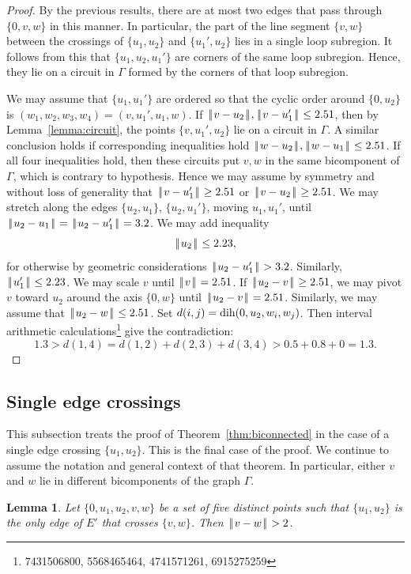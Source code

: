 \documentclass[11pt]{amsart}
\def\op#1{{\text{#1}}}
\def\text{\hbox}
\def\|{{\hskip0.1em|\hskip-0.15em|\hskip0.1em}}
\newtheorem{lemma}{Lemma}
\begin{document}
\begin{proof}  By the previous results, there are at most two edges that pass through $\{0,v,w\}$
in this manner.  In particular, the part of the line segment $\{v,w\}$ between the crossings
of $\{u_1,u_2\}$ and $\{u_1',u_2\}$ lies in a single loop subregion.  It follows from this that
$\{u_1,u_2,u_1'\}$ are corners of the same loop subregion.  Hence, they lie on a circuit in $\Gamma$
formed by the corners of that loop subregion.  

We may assume that $\{u_1,u_1'\}$ are ordered so that the cyclic order around $\{0,u_2\}$ is
$(w_1,w_2,w_3,w_4)=(v,u_1',u_1,w)$.  If $\|v-u_2\|,\|v-u_1'\|\le 2.51$, then by Lemma~\ref{lemma:circuit}, the points
$\{v,u_1',u_2\}$ lie on a circuit in $\Gamma$.  A similar conclusion holds if corresponding inequalities
hold $\|w-u_2\|,\|w-u_1\|\le 2.51$.  If all four inequalities hold, then these circuits put $v,w$ in the
same bicomponent of $\Gamma$, which is contrary to hypothesis.  Hence we may assume by symmetry and without
loss of generality that $\|v-u_1'\|\ge 2.51$ or $\|v-u_2\|\ge 2.51$.  
We may stretch along the edges $\{u_2,u_1\}$, $\{u_2,u_1'\}$, moving $u_1,u_1'$, 
until $\|u_2-u_1\|=\|u_2-u_1'\|=3.2$.   We may add inequality
$$
\|u_2\|\le 2.23,
$$
for otherwise by geometric considerations $\|u_2-u_1'\|> 3.2$.  Similarly, $\|u_1'\|\le 2.23$.
We may scale $v$ until $\|v\|=2.51$.
If $\|u_2-v\|\ge 2.51$, we may pivot $v$ toward $u_2$ around the axis $\{0,w\}$ until $\|u_2-v\|=2.51$.
Similarly, we may assume that $\|u_2-w\|\le 2.51$.
Set $d(i,j) = \op{dih}(0,u_2,w_i,w_j)$.
Then interval arithmetic calculations\footnote{7431506800, 5568465464, 4741571261, 6915275259 } give the contradiction:
$$
1.3 > d(1,4) = d(1,2) +d(2,3)+d (3,4) > 0.5 + 0.8 + 0 = 1.3.
$$
\end{proof}

\subsection*{Single edge crossings}

This subsection treats the proof of Theorem~\ref{thm:biconnected}
in the case of a single edge crossing $\{u_1,u_2\}$.  This is
the final case of the proof.
We continue to assume the notation and general context of that theorem.
In particular, either $v$ and $w$ lie in different bicomponents of
the graph $\Gamma$.

\begin{lemma}  Let $\{0,u_1,u_2,v,w\}$ be a set of five distinct
points such that $\{u_1,u_2\}$ is the only edge of $E'$ that
crosses $\{v,w\}$.  Then $\|v-w\|>2$.
\end{lemma}
\end{document}

